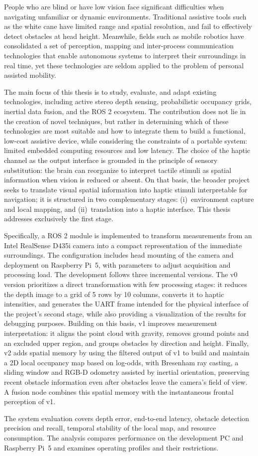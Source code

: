 People who are blind or have low vision face significant difficulties when navigating unfamiliar or
dynamic environments. Traditional assistive tools such as the white cane have limited range and
spatial resolution, and fail to effectively detect obstacles at head height. Meanwhile, fields such
as mobile robotics have consolidated a set of perception, mapping and inter-process communication
technologies that enable autonomous systems to interpret their surroundings in real time, yet
these technologies are seldom applied to the problem of personal assisted mobility.

The main focus of this thesis is to study, evaluate, and adapt existing technologies, including
active stereo depth sensing, probabilistic occupancy grids, inertial data fusion, and the ROS 2
ecosystem. The contribution does not lie in the creation of novel techniques, but rather in
determining which of these technologies are most suitable and how to integrate them to build a
functional, low-cost assistive device, while considering the constraints of a portable system:
limited embedded computing resources and low latency. The choice of the haptic channel as the
output interface is grounded in the principle of sensory substitution: the brain can reorganize to
interpret tactile stimuli as spatial information when vision is reduced or absent. On that basis,
the broader project seeks to translate visual spatial information into haptic stimuli interpretable
for navigation; it is structured in two complementary stages: (i)~environment capture and local
mapping, and (ii)~translation into a haptic interface. This thesis addresses exclusively the first
stage.

Specifically, a ROS 2 module is implemented to transform measurements from an Intel RealSense
D435i camera into a compact representation of the immediate surroundings. The configuration
includes head mounting of the camera and deployment on Raspberry Pi~5, with parameters to adjust
acquisition and processing load. The development follows three incremental
versions. The v0 version prioritizes a direct transformation with few processing stages: it reduces the depth image to
a grid of 5 rows by 10 columns, converts it to haptic intensities, and generates the UART frame
intended for the physical interface of the project's second stage, while also providing a visualization of the results for
debugging purposes.
Building on this basis, v1 improves measurement interpretation: it aligns the point cloud with
gravity, removes ground points and an excluded upper region, and groups obstacles by direction
and height. Finally, v2 adds spatial memory by using the filtered output of v1
to build and maintain a 2D local occupancy map based on log-odds, with Bresenham ray casting,
a sliding window and RGB-D odometry assisted by inertial orientation, preserving recent obstacle
information even after obstacles leave the camera's field of
view. A fusion node combines this spatial memory with the instantaneous frontal perception of v1.

The system evaluation covers depth error, end-to-end latency, obstacle detection precision and
recall, temporal stability of the local map, and resource consumption. The analysis compares
performance on the development PC and Raspberry Pi~5 and examines operating profiles and their
restrictions.

